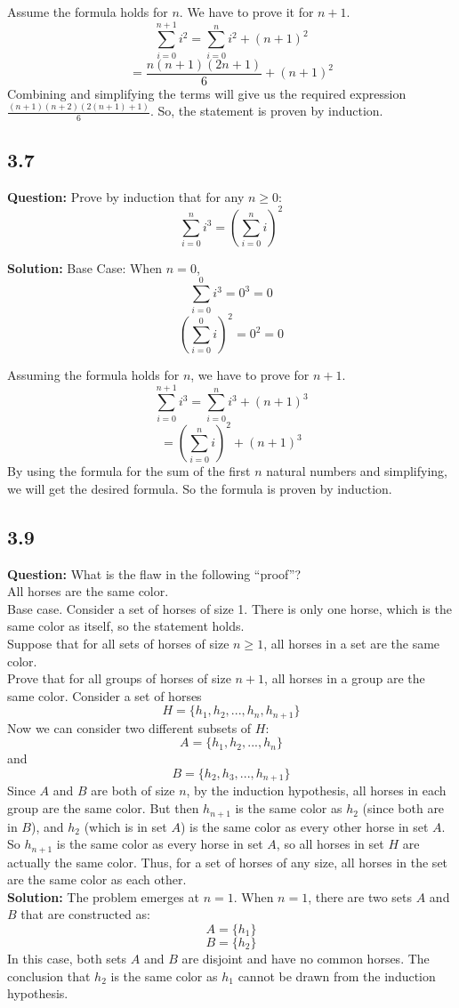 \documentclass{article}
\begin{document}
Assume the formula holds for \(n\). We have to prove it for \(n+1\).
\[ \sum_{i=0}^{n+1} i^2 = \sum_{i=0}^{n} i^2 + (n+1)^2 \]
\[ = \frac{n(n+1)(2n+1)}{6} + (n+1)^2 \]
Combining and simplifying the terms will give us the required expression \( \frac{(n+1)(n+2)(2(n+1)+1)}{6} \). So, the statement is proven by induction.

\subsection*{3.7}
\textbf{Question:} Prove by induction that for any \( n \geq 0 \):
\[ \sum_{i=0}^{n} i^3 = \left(\sum_{i=0}^{n} i\right)^2 \]

\textbf{Solution:}
Base Case:
When \(n = 0\), 
\[ \sum_{i=0}^{0} i^3 = 0^3 = 0 \]
\[ \left(\sum_{i=0}^{0} i\right)^2 = 0^2 = 0 \]

Assuming the formula holds for \(n\), we have to prove for \(n+1\).
\[ \sum_{i=0}^{n+1} i^3 = \sum_{i=0}^{n} i^3 + (n+1)^3 \]
\[ = \left(\sum_{i=0}^{n} i\right)^2 + (n+1)^3 \]
By using the formula for the sum of the first \(n\) natural numbers and simplifying, we will get the desired formula. So the formula is proven by induction.

\subsection*{3.9}
\textbf{Question:} What is the flaw in the following “proof”? \\
All horses are the same color.
\\[1\baselineskip]
Base case. Consider a set of horses of size 1. There is only one horse, which is the same color as itself, so the statement holds.
\\[1\baselineskip]
Suppose that for all sets of horses of size \( n \geq 1 \), all horses in a set are the same color.
\\[1\baselineskip]
Prove that for all groups of horses of size \( n + 1 \), all horses in a group are the same color. Consider a set of horses
\[ H = \{h_1, h_2, ... , h_n, h_{n+1}\} \]
Now we can consider two different subsets of \( H \):
\[ A = \{h_1, h_2, ... , h_n\} \] and
\[ B = \{h_2, h_3, ... , h_{n+1}\} \]
Since \( A \) and \( B \) are both of size \(n\), by the induction hypothesis, all horses in each group are the same color. But then \( h_{n+1} \) is the same color as \( h_2 \) (since both are in \( B \)), and \( h_2 \) (which is in set \( A \)) is the same color as every other horse in set \( A \). So \( h_{n+1} \) is the same color as every horse in set \( A \), so all horses in set \( H \) are actually the same color. Thus, for a set of horses of any size, all horses in the set are the same color as each other.
\\[1\baselineskip]
\textbf{Solution:}
The problem emerges at \( n = 1 \). When \( n = 1 \), there are two sets \( A \) and \( B \) that are constructed as:
\[ A = \{h_1\} \]
\[ B = \{h_2\} \]
In this case, both sets \( A \) and \( B \) are disjoint and have no common horses. The conclusion that \( h_2 \) is the same color as \( h_1 \) cannot be drawn from the induction hypothesis.
\newpage
\end{document}
